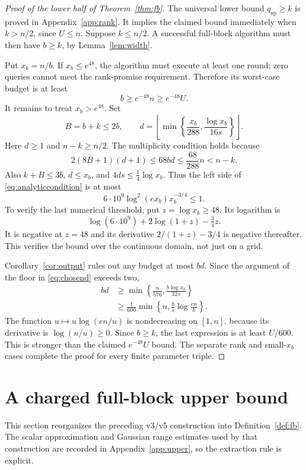 \documentclass[11pt]{article}
\theoremstyle{definition}
\newcommand{\qsp}{q_{\mathrm{sp}}}
\begin{document}
\begin{proof}[Proof of the lower half of Theorem~\ref{thm:fb}]
The universal lower bound $\qsp\ge k$ is proved in Appendix~\ref{app:rank}. It implies the claimed bound immediately when $k>n/2$, since $U\le n$. Suppose $k\le n/2$. A successful full-block algorithm must then have $b\ge k$, by Lemma~\ref{lem:width}.

Put $x_b=n/b$. If $x_b\le e^{48}$, the algorithm must execute at least one round; zero queries cannot meet the rank-promise requirement. Therefore its worst-case budget is at least
\[
b\ge e^{-48}n\ge e^{-48}U.
\]
It remains to treat $x_b>e^{48}$. Set
\begin{equation}\label{eq:chosend}
B=b+k\le2b,\qquad
 d=\left\lfloor\min\left\{\frac{x_b}{288},\frac{\log x_b}{16s}\right\}\right\rfloor.
\end{equation}
Here $d\ge1$ and $n-k\ge n/2$. The multiplicity condition holds because
\[
2(8B+1)(d+1)\le68bd\le\frac{68}{288}n<n-k.
\]
Also $k+B\le3b$, $d\le x_b$, and $4ds\le\tfrac14\log x_b$. Thus the left side of \eqref{eq:analyticcondition} is at most
\begin{equation}\label{eq:threshold}
6\cdot10^9\log^2(ex_b)x_b^{-3/4}\le1.
\end{equation}
To verify the last numerical threshold, put $z=\log x_b\ge48$. Its logarithm is
\[
\log(6\cdot10^9)+2\log(1+z)-\tfrac34z.
\]
It is negative at $z=48$ and its derivative $2/(1+z)-3/4$ is negative thereafter. This verifies the bound over the continuous domain, not just on a grid.

Corollary~\ref{cor:output} rules out any budget at most $bd$. Since the argument of the floor in \eqref{eq:chosend} exceeds two,
\begin{align*}
bd&\ge\min\left\{\frac n{576},\frac{b\log x_b}{32s}\right\}\\
&\ge\frac1{600}\min\left\{n,\frac b s\log\frac{en}{b}\right\}.
\end{align*}
The function $u\mapsto u\log(en/u)$ is nondecreasing on $[1,n]$, because its derivative is $\log(n/u)\ge0$. Since $b\ge k$, the last expression is at least $U/600$. This is stronger than the claimed $e^{-48}U$ bound. The separate rank and small-$x_b$ cases complete the proof for every finite parameter triple.
\end{proof}

\section{A charged full-block upper bound}\label{sec:fbupper}
This section reorganizes the preceding v3/v5 construction into Definition~\ref{def:fb}. The scalar approximation and Gaussian range estimates used by that construction are recorded in Appendix~\ref{app:upper}, so the extraction rule is explicit.
\end{document}
